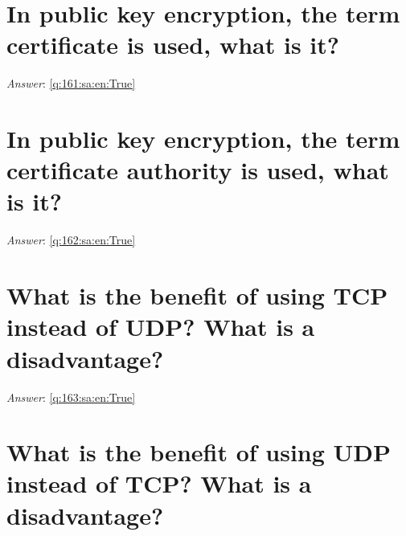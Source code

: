 \documentclass[a4paper,11pt,oneside]{book}
\begin{document}
\begin{sloppypar}
\section{In public key encryption, the term certificate is used, what is it?}

\label{q:161:sa:en:False}

\vspace{2cm}

\noindent\makebox[\textwidth]{\hrulefill}

\vspace{1cm}

\textit{Answer}: \autoref{q:161:sa:en:True}



\section{In public key encryption, the term certificate authority is used, what is it?}

\label{q:162:sa:en:False}

\vspace{2cm}

\noindent\makebox[\textwidth]{\hrulefill}

\vspace{1cm}

\textit{Answer}: \autoref{q:162:sa:en:True}



\section{What is the benefit of using TCP instead of UDP? What is a disadvantage?}

\label{q:163:sa:en:False}

\vspace{2cm}

\noindent\makebox[\textwidth]{\hrulefill}

\vspace{1cm}

\textit{Answer}: \autoref{q:163:sa:en:True}



\section{What is the benefit of using UDP instead of TCP? What is a disadvantage?}

\label{q:164:sa:en:False}

\vspace{2cm}


\end{sloppypar}
\end{document}
